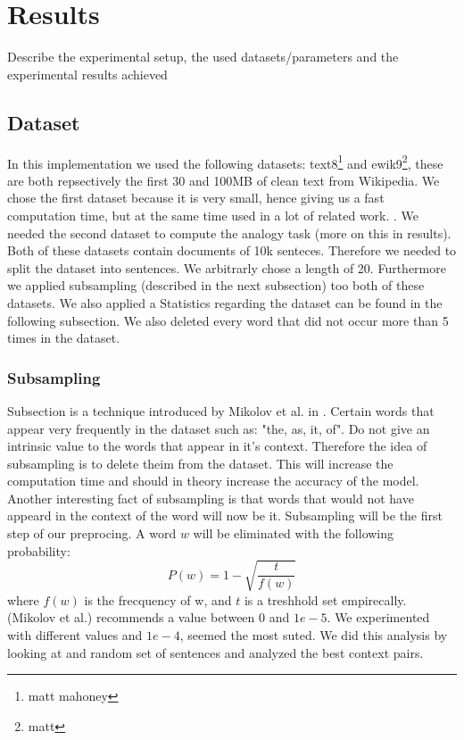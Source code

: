 \chapter{Results}\label{chap:results}


Describe the experimental setup, the used datasets/parameters and the experimental results achieved

\section{Dataset}
In this implementation we used the following datasets: text8\footnote{matt mahoney} and ewik9\footnote{matt}, these are both repsectively the first 30 and 100MB of clean text from Wikipedia. We chose the first dataset because it is very small, hence giving us a fast computation time, but at the same time used in a lot of related work. \cite{intel} \cite{gpu}. We needed the second dataset to compute the analogy task (more on this in results). 
Both of these datasets contain documents of 10k senteces. Therefore we needed to split the dataset into sentences. We arbitrarly chose a length of 20. Furthermore we applied subsampling (described in the next subsection)  too both of these datasets. We also applied a Statistics regarding the dataset can be found in the following subsection. We also deleted every word that did not occur more than 5 times in the dataset. 
\subsection{Subsampling}
Subsection is a technique introduced by Mikolov et al. in \cite{mikolov}. Certain words that appear very frequently in the dataset such as: "the, as, it, of". Do not give an intrinsic value to the words that appear in it's context. Therefore the idea of subsampling is to delete theim from the dataset. This will increase the computation time and should in theory increase the accuracy of the model. Another interesting fact of subsampling is that words that would not have appeard in the context of the word will now be it. 
Subsampling will be the first step of our preprocing. A word $w$ will be eliminated with the following probability:
\begin{equation}
P(w) = 1- \sqrt{{\frac{t}{f(w)}}}
\end{equation}
where $f(w)$ is the frecquency of w, and $t$ is a treshhold set empirecally. (Mikolov et al.)  recommends a value between $0$ and $1e-5$. We experimented with different values and $1e-4$, seemed the most suted. We did this analysis by looking at and random set of sentences and analyzed the best context pairs. 
